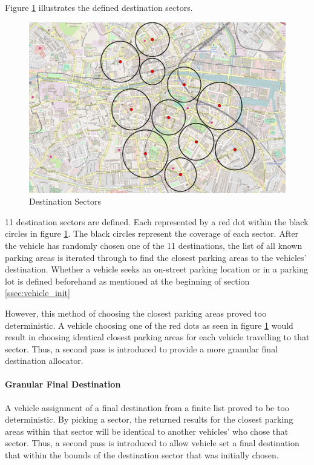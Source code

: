 Figure \ref{fig:destination_sectors_initial} illustrates the defined destination sectors.

\begin{figure}[H]
    \centering
    \includegraphics[width=\textwidth]{./Images/DESTINATIONSECTORSINITIAL.png}
    \caption{Destination Sectors}
    \label{fig:destination_sectors_initial}
\end{figure}

11 destination sectors are defined. Each represented by a red dot within the black circles in figure \ref{fig:destination_sectors_initial}. The black circles represent the coverage of each sector. After the vehicle has randomly chosen one of the 11 destinations, the list of all known parking areas is iterated through to find the closest parking areas to the vehicles' destination. Whether a vehicle seeks an on-street parking location or in a parking lot is defined beforehand as mentioned at the beginning of section \ref{ssec:vehicle_init}

However, this method of choosing the closest parking areas proved too deterministic. A vehicle choosing one of the red dots as seen in figure \ref{fig:destination_sectors_initial} would result in choosing identical closest parking areas for each vehicle travelling to that sector. Thus, a second pass is introduced to provide a more granular final destination allocator.

\paragraph{Granular Final Destination}
A vehicle assignment of a final destination from a finite list proved to be too deterministic. By picking a sector, the returned results for the closest parking areas within that sector will be identical to another vehicles' who chose that sector. Thus, a second pass is introduced to allow vehicle set a final destination that within the bounds of the destination sector that was initially chosen. 

